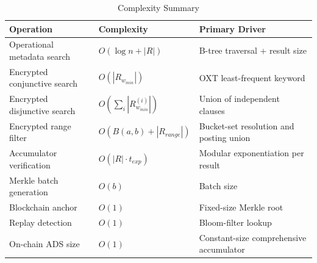 \begin{table}[t]
\centering
\caption{Complexity Summary}
\label{tab:complexity}
\scriptsize
\setlength{\tabcolsep}{3pt}
\begin{tabular}{p{2.3cm}p{2.3cm}p{2.0cm}}
\toprule
\textbf{Operation} & \textbf{Complexity} & \textbf{Primary Driver} \\
\midrule
Operational metadata search & $O(\log n + |R|)$ & B-tree traversal + result size \\
Encrypted conjunctive search & $O(|R_{w_{min}}|)$ & OXT least-frequent keyword \\
Encrypted disjunctive search & $O(\sum_i |R_{w_{min}}^{(i)}|)$ & Union of independent clauses \\
Encrypted range filter & $O(B(a,b) + |R_{range}|)$ & Bucket-set resolution and posting union \\
Accumulator verification & $O(|R|\cdot t_{exp})$ & Modular exponentiation per result \\
Merkle batch generation & $O(b)$ & Batch size \\
Blockchain anchor & $O(1)$ & Fixed-size Merkle root \\
Replay detection & $O(1)$ & Bloom-filter lookup \\
On-chain ADS size & $O(1)$ & Constant-size comprehensive accumulator \\
\bottomrule
\end{tabular}
\end{table}
